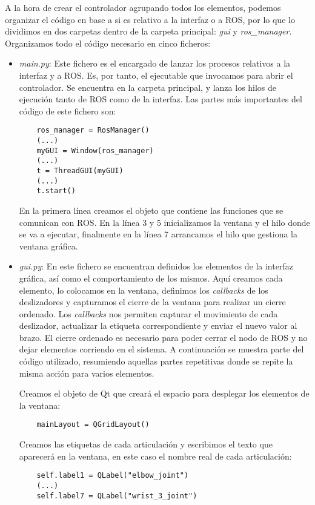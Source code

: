 A la hora de crear el controlador agrupando todos los elementos, podemos organizar el código en base a si es relativo a la interfaz o a ROS, por lo que lo dividimos en dos carpetas dentro de la carpeta principal: \textit{gui} y \textit{ros\_manager}. Organizamos todo el código necesario en cinco ficheros:
\begin{itemize}
	\item \textit{main.py}: Este fichero es el encargado de lanzar los procesos relativos a la interfaz y a ROS. Es, por tanto, el ejecutable que invocamos para abrir el controlador. Se encuentra en la carpeta principal, y lanza los hilos de ejecución tanto de ROS como de la interfaz. Las partes más importantes del código de este fichero son:
	\lstset{language=Python}
	\begin{lstlisting}
	ros_manager = RosManager()
	(...)
	myGUI = Window(ros_manager)
	(...)
	t = ThreadGUI(myGUI)
	(...)
	t.start()
	\end{lstlisting}
	
	En la primera línea creamos el objeto que contiene las funciones que se comunican con ROS. En la línea 3 y 5 inicializamos la ventana y el hilo donde se va a ejecutar, finalmente en la línea 7 arrancamos el hilo que gestiona la ventana gráfica. 
	
	\item \textit{gui.py}: En este fichero se encuentran definidos los elementos de la interfaz gráfica, así como el comportamiento de los mismos. Aquí creamos cada elemento, lo colocamos en la ventana, definimos los \textit{callbacks} de los deslizadores y capturamos el cierre de la ventana para realizar un cierre ordenado. Los \textit{callbacks} nos permiten capturar el movimiento de cada deslizador, actualizar la etiqueta correspondiente y enviar el nuevo valor al brazo. El cierre ordenado es necesario para poder cerrar el nodo de ROS y no dejar elementos corriendo en el sistema. A continuación se muestra parte del código utilizado, resumiendo aquellas partes repetitivas donde se repite la misma acción para varios elementos.
	
	Creamos el objeto de Qt que creará el espacio para desplegar los elementos de la ventana:
	\begin{lstlisting}
	mainLayout = QGridLayout()
	\end{lstlisting}
	
	Creamos las etiquetas de cada articulación y escribimos el texto que aparecerá en la ventana, en este caso el nombre real de cada articulación:
	\begin{lstlisting}
	self.label1 = QLabel("elbow_joint")
	(...)
	self.label7 = QLabel("wrist_3_joint")
	\end{lstlisting}
	

\end{itemize}
